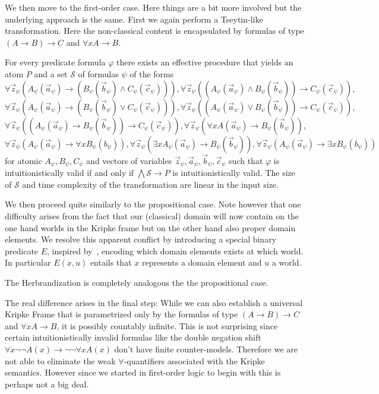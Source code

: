 \documentclass[a4paper,UKenglish,cleveref, autoref, thm-restate]{lipics-v2021}
\begin{document}
We then move to the first-order case. Here things are a bit more involved but the underlying approach is the same. First we again perform a Tseytin-like transformation. Here the non-classical content is encapsulated by formulas of type $(A\to B)\to C$ and $\forall xA\to B$.

\begin{theorem}
	For every predicate formula $\varphi$ there exists an effective procedure that yields an atom $P$ and a set $\mathcal S$ of formulas $\psi$ of the forms
	$$\forall \vec z_\psi(A_\psi(\vec a_\psi)\to (B_\psi(\vec b_\psi)\wedge C_\psi(\vec c_\psi))), \forall \vec z_\psi((A_\psi(\vec a_\psi)\wedge B_\psi(\vec b_\psi))\to C_\psi(\vec c_\psi)),$$$$\forall \vec z_\psi(A_\psi(\vec a_\psi)\to (B_\psi(\vec b_\psi)\vee C_\psi(\vec c_\psi))),
	\forall \vec z_\psi((A_\psi(\vec a_\psi)\vee B_\psi(\vec b_\psi))\to C_\psi(\vec c_\psi)),$$$$ \forall \vec z_\psi((A_\psi(\vec a_\psi)\to B_\psi(\vec b_\psi))\to C_\psi(\vec c_\psi)),\forall \vec z_\psi(\forall xA(\vec a_\psi)\to B_\psi(\vec b_\psi)),$$$$ \forall \vec z_\psi(A_\psi(\vec a_\psi)\to\forall xB_\psi(b_\psi)), \forall \vec z_\psi(\exists xA_\psi(\vec a_\psi)\to B_\psi(\vec b_\psi)), \forall \vec z_\psi(A_\psi(\vec a_\psi)\to\exists xB_\psi(b_\psi))$$for atomic $A_\psi, B_\psi, C_\psi$ and vectors of variables $\vec z_\psi, \vec a_\psi, \vec b_\psi, \vec c_\psi$ such that $\varphi$ is intuitionistically valid if and only if $\bigwedge\mathcal S\to P$ is intuitionistically valid. The size of $\mathcal S$ and time complexity of the transformation are linear in the input size.
\end{theorem}

We then proceed quite similarly to the propositional case. Note however that one difficulty arises from the fact that our (classical) domain will now contain on the one hand worlds in the Kripke frame but on the other hand also proper domain elements. We resolve this apparent conflict by introducing a special binary predicate $E$, inspired by~\cite{iemhoff2010eskolemization}, encoding which domain elements exists at which world. In particular $E(x, u)$ entails that $x$ represents a domain element and $u$ a world.

The Herbrandization is completely analogous the the propositional case.

The real difference arises in the final step: While we can also establish a universal Kripke Frame that is parametrized only by the formulas of type $(A\to B)\to C$ and $\forall xA\to B$, it is possibly countably infinite. This is not surprising since certain intuitionistically invalid formulas like the double negation shift $\forall x\neg\neg A(x)\to \neg\neg\forall x A(x)$ don't have finite counter-models. Therefore we are not able to eliminate the weak $\forall$-quantifiers associated with the Kripke semantics. However since we started in first-order logic to begin with this is perhaps not a big deal.
\end{document}
